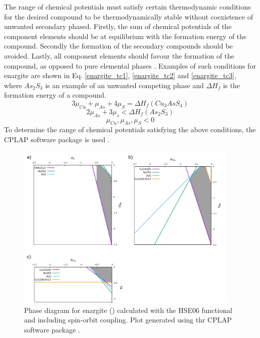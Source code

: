 \documentclass[11pt, twoside]{report}
\begin{document}
The range of chemical potentials must satisfy certain thermodynamic conditions for the desired compound to be thermodynamically stable without coexistence of unwanted secondary phased. Firstly, the sum of chemical potentials of the component elements should be at equilibrium with the formation energy of the compound. Secondly the formation of the secondary compounds should be avoided. Lastly, all component elements should favour the formation of the compound, as opposed to pure elemental phases \cite{defects_Chen}. Examples of such conditions for enargite are shown in Eq. \ref{enargite_tc1}, \ref{enargite_tc2} and \ref{enargite_tc3}, where $As_2S_3$ is an example of an unwanted competing phase and $\Delta H_f$ is the formation energy of a compound.
\begin{equation}\label{enargite_tc1}
3\mu_{Cu} + \mu_{As} + 4\mu_{S} = \Delta H_f(Cu_3AsS_4)    
\end{equation}
\begin{equation}\label{enargite_tc2}
2\mu_{As} + 3\mu_{s} < \Delta H_f(As_2S_3)
\end{equation}
\begin{equation}\label{enargite_tc3}
\mu_{Cu}, \mu_{As}, \mu_{S} < 0    
\end{equation}
To determine the range of chemical potentials satisfying the above conditions, the CPLAP software package is used \cite{cplap}. 

\begin{figure}[h!]
    \centering
    \includegraphics[width=0.95\textwidth]{figures/enargite_p_d.png}
    \caption[Phase diagram for enargite ({\enargite}) calculated with the HSE06 functional and including spin-orbit coupling.]{Phase diagram for enargite ({\enargite}) calculated with the HSE06 functional and including spin-orbit coupling. Plot generated using thr CPLAP software package \cite{cplap}.}
    \label{enargite_p_d}
\end{figure}
\end{document}
